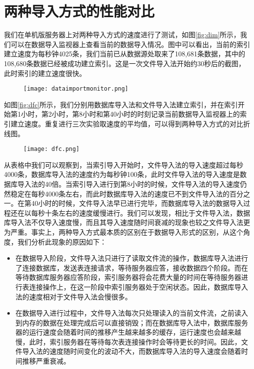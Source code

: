 \section{两种导入方式的性能对比}

我们在单机版服务器上对两种导入方式的速度进行了测试，如图\ref{fig:dim}所示，我们可以在数据导入监视器上查看当前的数据导入情况。图中可以看出，当前的索引建立速度为每秒钟4025条，我们当前已从数据源处取来了108,681条数据，其中的108,680条数据已经被成功建立索引。这是一次文件导入法开始约30秒后的截图，此时索引的建立速度很快。

\begin{figure}[!htp]
  \centering
  \texttt{[image: dataimportmonitor.png]}
\end{figure}

如图\ref{fig:dfc}所示，我们分别用数据库导入法和文件导入法建立索引，并在索引开始第1小时，第2小时，第8小时和第40小时的时刻记录当前数据导入监视器上的索引建立速度。重复进行三次实验取速度的平均值，可以得到两种导入方式的对比折线图。

\begin{figure}[!htp]
  \centering
  \texttt{[image: dfc.png]}
\end{figure}

从表格中我们可以观察到，当索引导入开始时，文件导入法的导入速度超过每秒4000条，数据库导入法的速度约为每秒钟100条，此时文件导入法的导入速度是数据库导入法的40倍。当索引导入进行到第8小时的时候，文件导入法的导入速度仍然稳定在每秒4000条左右，而此时数据库导入法的速度已不到文件导入法的百分之一。在第40小时的时候，文件导入法早已进行完毕，而数据库导入法的数据导入过程还在以每秒十条左右的速度缓慢进行。我们可以发现，相比于文件导入法，数据库导入法不仅导入速度慢，而且其导入速度随时间衰减的现象也较之文件导入法更为严重。事实上，两种导入方式最本质的区别在于数据导入形式的区别，从这个角度，我们分析此现象的原因如下：

\begin{itemize}
\item 在数据导入阶段，文件导入法只进行了读取文件流的操作，数据库导入法进行了连接数据库，发送表连接请求，等待服务器应答，接收数据四个阶段。而在等待数据库服务器应答阶段，索引服务器将会花费大量的时间在等待服务器进行表连接操作上，在这一阶段中索引服务器处于空闲状态。因此，数据库导入法的速度相对于文件导入法会慢很多。
\item 在数据导入进行过程中，文件导入法每次只处理读入的当前文件流，之前读入到内存的数据在处理完成后可以直接销毁；而在数据库导入法中，数据库服务器的运行速度会随着时间的推移产生越来越多的缓存，运行速度也会越来越慢，此时，索引服务器在等待每次表连接操作时会等待更长的时间。因此，文件导入法的速度随时间变化的波动不大，而数据库导入法的导入速度会随着时间推移严重衰减。
\end{itemize}